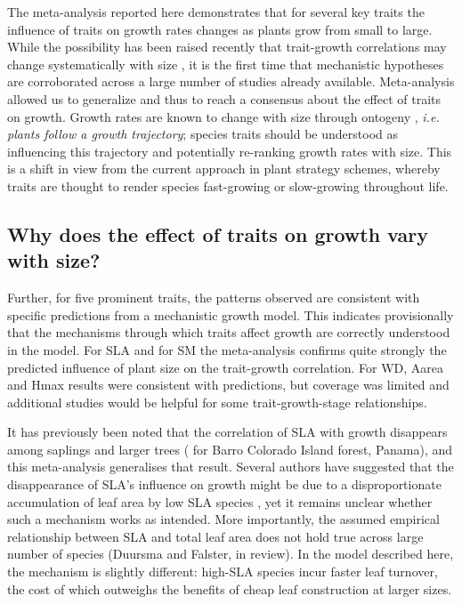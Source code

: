 \documentclass[a4paper,11pt]{article}
\begin{document}
The meta-analysis reported here demonstrates that for several key traits the influence of traits on growth rates changes as plants grow from small to large. While the possibility has been raised recently that trait-growth correlations may change systematically with size \citep{Falster:2011ii, Ruger:2012jv, Iida:2014ep, Iida:2014hq}, it is the first time that mechanistic hypotheses are corroborated across a large number of studies already available. Meta-analysis allowed us to generalize and thus to reach a consensus about the effect of traits on growth. Growth rates are known to change with size through ontogeny \citep{Condit:1993hd, Clark:1999ed, Herault:2011dd}, \textit{i.e. plants follow a growth trajectory}; species traits should be understood as influencing this trajectory and potentially re-ranking growth rates with size. This is a shift in view from the current approach in plant strategy schemes, whereby traits are thought to render species fast-growing or slow-growing throughout life.

\subsection*{Why does the effect of traits on growth vary with size?}

Further, for five prominent traits, the patterns observed are consistent with specific predictions from a mechanistic growth model. This indicates provisionally that the mechanisms through which traits affect growth are correctly understood in the model. For SLA and for SM the meta-analysis confirms quite strongly the predicted influence of plant size on the trait-growth correlation. For WD, Aarea and Hmax results were consistent with predictions, but coverage was limited and additional studies would be helpful for some trait-growth-stage relationships.

It has previously been noted that the correlation of SLA with growth disappears among saplings and larger trees (\citealt{Wright:2010tp} for Barro Colorado Island forest, Panama), and this meta-analysis generalises that result. Several authors have suggested that the disappearance of SLA's influence on growth might be due to a disproportionate accumulation of leaf area by low SLA species \citep{Reich:1992wm,Poorter:2008iu,Wright:2010tp}, yet it remains unclear whether such a mechanism works as intended. More importantly, the assumed empirical relationship between SLA and total leaf area does not hold true across large number of species (Duursma and Falster, in review). In the model described here, the mechanism is slightly different: high-SLA species incur faster leaf turnover, the cost of which outweighs the benefits of cheap leaf construction at larger sizes.
\end{document}
